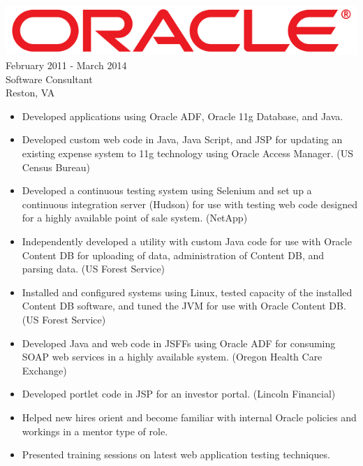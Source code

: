 \documentclass[12pt, line, margin]{res}
\begin{document}
\begin{resume}
                {\sl \includegraphics[scale=0.1]{resume_images/663px-Oracle_logo.png}} \hfill            February 2011 - March 2014 \\
                Software Consultant \\ Reston, VA
                \begin{itemize}  \itemsep -2pt %
                 \item Developed applications using Oracle ADF,
			 Oracle 11g Database, and Java.
	      \item Developed custom web code in Java, Java Script, and JSP for \newline 
		       updating an existing expense system to 11g technology using \newline 
                       Oracle Access Manager. (US Census Bureau)
	      \item Developed a continuous testing system using Selenium
			 and set up a continuous integration server (Hudson)
			 for use with testing web code designed for a
			 highly available point of sale system. (NetApp)
	      \item Independently developed a utility with custom Java code for use with
			 Oracle Content DB for uploading of data, administration
			 of Content DB, and parsing data.
			(US Forest Service)
	      \item Installed and configured systems using Linux, tested capacity
			 of the installed Content DB software, and tuned the JVM
			 for use with Oracle Content DB. (US Forest Service)
      	      \item Developed Java and web code in JSFFs using Oracle ADF for \newline
                       consuming SOAP web services in a highly available system. \newline 
                       (Oregon Health Care Exchange)
	      \item Developed portlet code in JSP for an investor portal. \newline
			(Lincoln Financial)
	      \item Helped new hires orient and become familiar with internal 
			Oracle policies and workings in a mentor type of role.
	      \item Presented training sessions on latest web application testing \newline
			 techniques.
                 \end{itemize} 


\end{resume}
\end{document}
